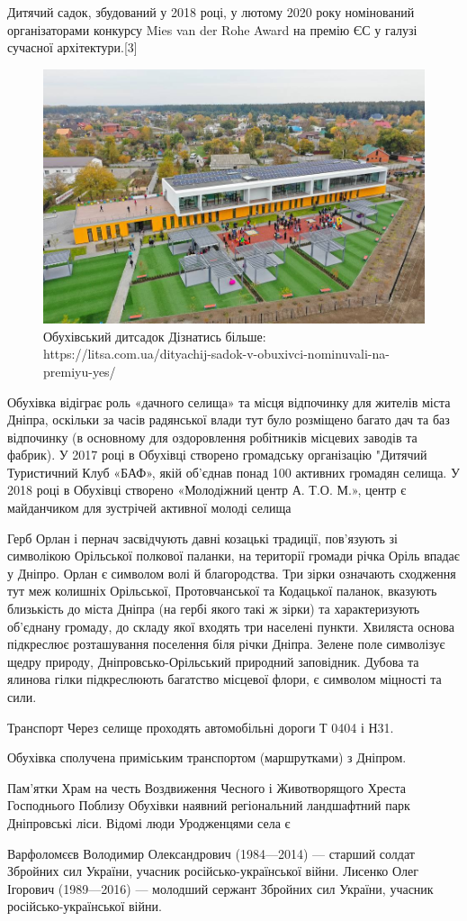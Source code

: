 Дитячий садок, збудований у 2018 році, у лютому 2020 року номінований організаторами конкурсу Mies van der Rohe Award на премію ЄС у галузі сучасної архітектури.[3]
\begin{figure}
	\centering
	\includegraphics[width=0.8\linewidth]{24}
	\caption{	\centering Обухівський дитсадок Дізнатись більше: https://litsa.com.ua/dityachij-sadok-v-obuxivci-nominuvali-na-premiyu-yes/}
	\label{fig:24}
\end{figure}

Обухівка відіграє роль «дачного селища» та місця відпочинку для жителів міста Дніпра, оскільки за часів радянської влади тут було розміщено багато дач та баз відпочинку (в основному для оздоровлення робітників місцевих заводів та фабрик). У 2017 році в Обухівці створено громадську організацію "Дитячий Туристичний Клуб «БАФ», якій об'єднав понад 100 активних громадян селища. У 2018 році в Обухівці створено «Молодіжний центр А. Т.О. М.», центр є майданчиком для зустрічей активної молоді селища

Герб
Орлан і пернач засвідчують давні козацькі традиції, пов’язують зі символікою Орільської полкової паланки, на території громади річка Оріль впадає у Дніпро. Орлан є символом волі й благородства. Три зірки означають сходження тут меж колишніх Орільської, Протовчанської та Кодацької паланок, вказують близькість до міста Дніпра (на гербі якого такі ж зірки) та характеризують об’єднану громаду, до складу якої входять три населені пункти. Хвиляста основа підкреслює розташування поселення біля річки Дніпра. Зелене поле символізує щедру природу, Дніпровсько-Орільський природний заповідник. Дубова та ялинова гілки підкреслюють багатство місцевої флори, є символом міцності та сили.

Транспорт
Через селище проходять автомобільні дороги Т 0404 і Н31.

Обухівка сполучена приміським транспортом (маршрутками) з Дніпром.

Пам'ятки
Храм на честь Воздвиження Чесного і Животворящого Хреста Господнього
Поблизу Обухівки наявний регіональний ландшафтний парк Дніпровські ліси.
Відомі люди
Уродженцями села є

Варфоломєєв Володимир Олександрович (1984—2014) — старший солдат Збройних сил України, учасник російсько-української війни.
Лисенко Олег Ігорович (1989—2016) — молодший сержант Збройних сил України, учасник російсько-української війни.
	
